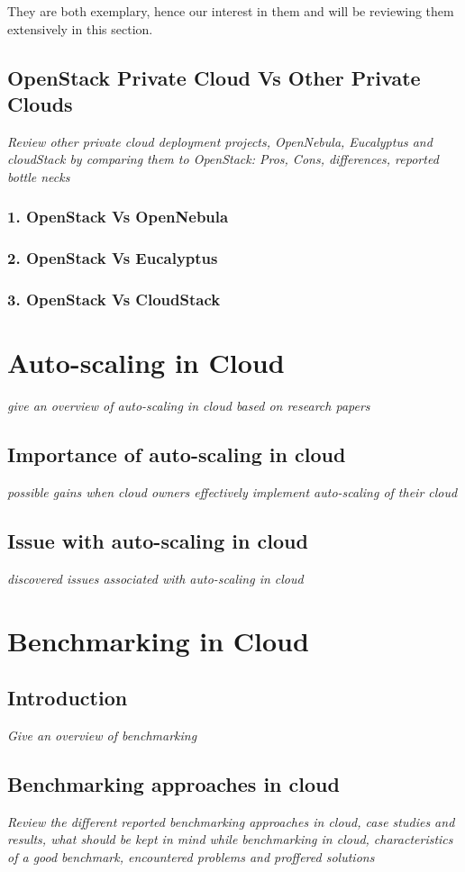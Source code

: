 They are both exemplary, hence our interest in them and will be reviewing them extensively in this section.

\subsection{OpenStack Private Cloud Vs Other Private Clouds}
    \textit{Review other private cloud deployment projects, OpenNebula, Eucalyptus and cloudStack by comparing them to OpenStack: Pros, Cons, differences, reported bottle necks }
    	\subsubsection{1. OpenStack Vs OpenNebula}
        \subsubsection{2. OpenStack Vs Eucalyptus}
        \subsubsection{3. OpenStack Vs CloudStack}    

\section{Auto-scaling in Cloud}
    \textit{give an overview of auto-scaling in cloud based on research papers}
    \subsection{Importance of auto-scaling in cloud}
    \textit{possible gains when cloud owners effectively implement auto-scaling of their cloud}
    \subsection{Issue with auto-scaling in cloud}
    \textit{discovered issues associated with auto-scaling in cloud }
    
    \section{Benchmarking in Cloud}
	\subsection{Introduction}
\textit{Give an overview of benchmarking}
	\subsection{Benchmarking approaches in cloud}
    \textit{Review the different reported benchmarking approaches in cloud, case studies and results, what should be kept in mind while benchmarking in cloud, characteristics of a good benchmark, encountered problems and proffered solutions}
